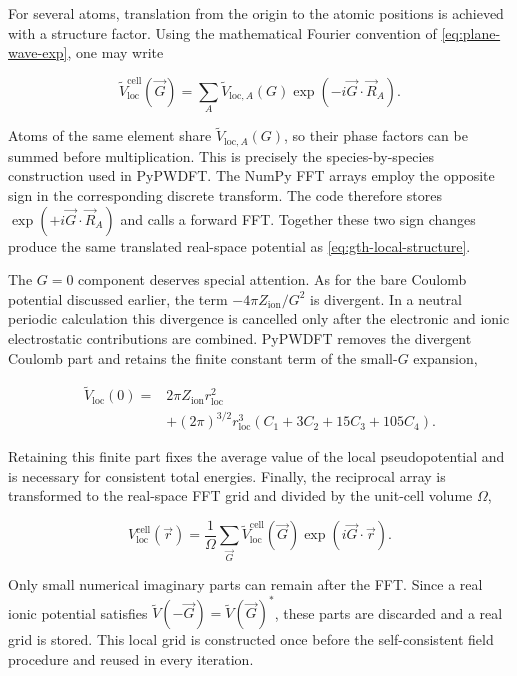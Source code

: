 For several atoms, translation from the origin to the atomic positions is achieved with a structure factor. Using the mathematical Fourier convention of \cref{eq:plane-wave-exp}, one may write

\begin{equation}
    \widetilde{V}_{\text{loc}}^{\text{cell}}(\vec{G})
    = \sum_{A}\widetilde{V}_{\text{loc},A}(G)
    \exp\left(-i\vec{G}\cdot\vec{R}_{A}\right).
    \label{eq:gth-local-structure}
\end{equation}

Atoms of the same element share $\widetilde{V}_{\text{loc},A}(G)$, so their phase factors can be summed before multiplication. This is precisely the species-by-species construction used in PyPWDFT. The NumPy FFT arrays employ the opposite sign in the corresponding discrete transform. The code therefore stores $\exp(+i\vec{G}\cdot\vec{R}_{A})$ and calls a forward FFT. Together these two sign changes produce the same translated real-space potential as \cref{eq:gth-local-structure}.

The $G=0$ component deserves special attention. As for the bare Coulomb potential discussed earlier, the term $-4\pi Z_{\text{ion}}/G^{2}$ is divergent. In a neutral periodic calculation this divergence is cancelled only after the electronic and ionic electrostatic contributions are combined. PyPWDFT removes the divergent Coulomb part and retains the finite constant term of the small-$G$ expansion,

\begin{align}
    \widetilde{V}_{\text{loc}}(0) ={}&
    2\pi Z_{\text{ion}}r_{\text{loc}}^{2} \nonumber\\
    &+(2\pi)^{3/2}r_{\text{loc}}^{3}
    \left(C_{1}+3C_{2}+15C_{3}+105C_{4}\right).
    \label{eq:gth-local-zero}
\end{align}

Retaining this finite part fixes the average value of the local pseudopotential and is necessary for consistent total energies. Finally, the reciprocal array is transformed to the real-space FFT grid and divided by the unit-cell volume $\Omega$,

\begin{equation}
    V_{\text{loc}}^{\text{cell}}(\vec{r})
    = \frac{1}{\Omega}\sum_{\vec{G}}
    \widetilde{V}_{\text{loc}}^{\text{cell}}(\vec{G})
    \exp(i\vec{G}\cdot\vec{r}).
    \label{eq:gth-local-cell}
\end{equation}

Only small numerical imaginary parts can remain after the FFT. Since a real ionic potential satisfies $\widetilde{V}(-\vec{G})=\widetilde{V}(\vec{G})^{*}$, these parts are discarded and a real grid is stored. This local grid is constructed once before the self-consistent field procedure and reused in every iteration.

